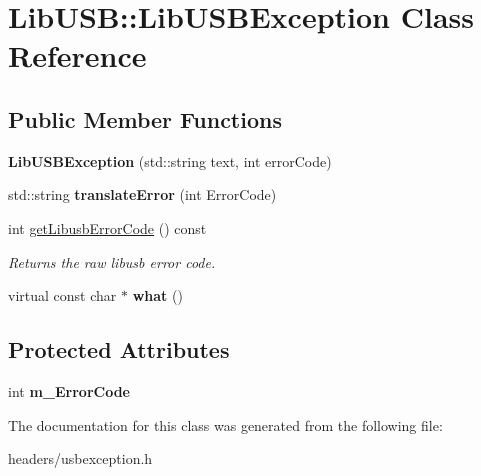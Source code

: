 \hypertarget{class_lib_u_s_b_1_1_lib_u_s_b_exception}{\section{Lib\-U\-S\-B\-:\-:Lib\-U\-S\-B\-Exception Class Reference}
\label{class_lib_u_s_b_1_1_lib_u_s_b_exception}
}
\subsection*{Public Member Functions}
\begin{DoxyCompactItemize}
\item 
\hypertarget{class_lib_u_s_b_1_1_lib_u_s_b_exception_ab6e9f0079def8ba7d351922337a91e32}{{\bfseries Lib\-U\-S\-B\-Exception} (std\-::string text, int error\-Code)}\label{class_lib_u_s_b_1_1_lib_u_s_b_exception_ab6e9f0079def8ba7d351922337a91e32}

\item 
\hypertarget{class_lib_u_s_b_1_1_lib_u_s_b_exception_ae269c1b05e34aa58bea037999d327848}{std\-::string {\bfseries translate\-Error} (int Error\-Code)}\label{class_lib_u_s_b_1_1_lib_u_s_b_exception_ae269c1b05e34aa58bea037999d327848}

\item 
\hypertarget{class_lib_u_s_b_1_1_lib_u_s_b_exception_a2a64f523c22d02a51131b43686c8c75f}{int \hyperlink{class_lib_u_s_b_1_1_lib_u_s_b_exception_a2a64f523c22d02a51131b43686c8c75f}{get\-Libusb\-Error\-Code} () const }\label{class_lib_u_s_b_1_1_lib_u_s_b_exception_a2a64f523c22d02a51131b43686c8c75f}

\begin{DoxyCompactList}\small\item\em Returns the raw libusb error code. \end{DoxyCompactList}\item 
\hypertarget{class_lib_u_s_b_1_1_lib_u_s_b_exception_aedc3594fd518b3ba24e45f97b429a428}{virtual const char $\ast$ {\bfseries what} ()}\label{class_lib_u_s_b_1_1_lib_u_s_b_exception_aedc3594fd518b3ba24e45f97b429a428}

\end{DoxyCompactItemize}
\subsection*{Protected Attributes}
\begin{DoxyCompactItemize}
\item 
\hypertarget{class_lib_u_s_b_1_1_lib_u_s_b_exception_acb9f57634841a024e7222c66433042ff}{int {\bfseries m\-\_\-\-Error\-Code}}\label{class_lib_u_s_b_1_1_lib_u_s_b_exception_acb9f57634841a024e7222c66433042ff}

\end{DoxyCompactItemize}


The documentation for this class was generated from the following file\-:\begin{DoxyCompactItemize}
\item 
headers/usbexception.\-h\end{DoxyCompactItemize}
